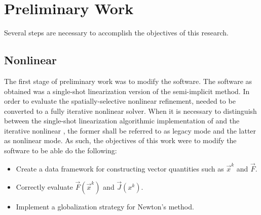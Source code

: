 \chapter{Preliminary Work}
\label{chap:prelim_work}
Several steps are necessary to accomplish the objectives of this research.

\section{Nonlinear \cobra{}}
\label{sect:nl_cobra}
The first stage of preliminary work was to modify the \cobra{} software.
The \cobra{} software as obtained was a single-shot linearization version of the semi-implicit method.
In order to evaluate the spatially-selective nonlinear refinement, \cobra{} needed to be converted to a fully iterative nonlinear solver.
When it is necessary to distinguish between the single-shot linearization algorithmic implementation of \cobra{} and the iterative nonlinear \cobra{}, the former shall be referred to as legacy mode and the latter as nonlinear mode.
As such, the objectives of this work were to modify the software to be able do the following:

\begin{itemize}
\item{Create a data framework for constructing vector quantities such as $\vec{x}^{k}$ and $\vec{F}$.}
\item{Correctly evaluate $\vec{F}(\vec{x}^{k})$ and $\vec{J}(x^{k})$.}
\item{Implement a globalization strategy for Newton's method.}
\end{itemize}

